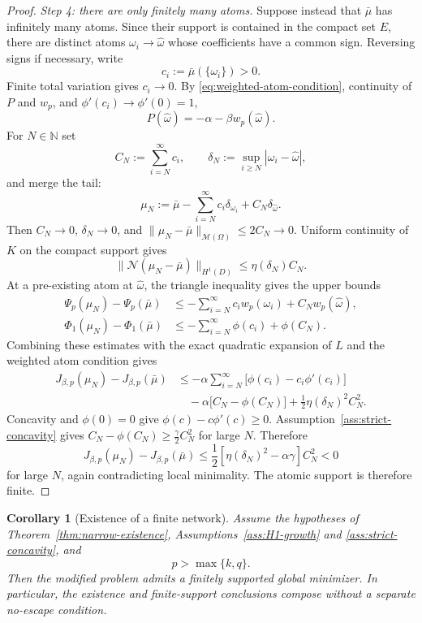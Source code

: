 \documentclass[11pt]{amsart}
\newtheorem{corollary}[theorem]{Corollary}
\theoremstyle{definition}
\theoremstyle{remark}
\newcommand{\M}{\mathcal{M}}
\newcommand{\N}{\mathcal{N}}
\begin{document}
\begin{proof}
\medskip
\noindent
\emph{Step 4: there are only finitely many atoms.}
Suppose instead that $\bar\mu$ has infinitely many atoms.  Since their support
is contained in the compact set $E$, there are distinct atoms
$\omega_i\to\widehat\omega$ whose coefficients have a common sign.  Reversing
signs if necessary, write
\[
  c_i:=\bar\mu(\{\omega_i\})>0.
\]
Finite total variation gives $c_i\to0$.  By
\eqref{eq:weighted-atom-condition}, continuity of $P$ and $w_p$, and
$\phi'(c_i)\to\phi'(0)=1$,
\[
  P(\widehat\omega)
  =
  -\alpha-\beta w_p(\widehat\omega).
\]
For $N\in\mathbb{N}$ set
\[
  C_N:=\sum_{i=N}^\infty c_i,\qquad
  \delta_N:=\sup_{i\geq N}|\omega_i-\widehat\omega|,
\]
and merge the tail:
\[
  \mu_N
  :=
  \bar\mu-\sum_{i=N}^\infty c_i\delta_{\omega_i}
  +C_N\delta_{\widehat\omega}.
\]
Then $C_N\to0$, $\delta_N\to0$, and
$\|\mu_N-\bar\mu\|_{\M(\Omega)}\leq2C_N\to0$.  Uniform continuity of $K$ on
the compact support gives
\[
  \|\N(\mu_N-\bar\mu)\|_{H^1(D)}
  \leq\eta(\delta_N)C_N.
\]
At a pre-existing atom at $\widehat\omega$, the triangle inequality gives the
upper bounds
\begin{align*}
  \Psi_p(\mu_N)-\Psi_p(\bar\mu)
  &\leq
  -\sum_{i=N}^\infty c_i w_p(\omega_i)
  +C_N w_p(\widehat\omega),\\
  \Phi_1(\mu_N)-\Phi_1(\bar\mu)
  &\leq
  -\sum_{i=N}^\infty\phi(c_i)+\phi(C_N).
\end{align*}
Combining these estimates with the exact quadratic expansion of $L$ and the
weighted atom condition gives
\begin{align*}
  J_{\beta,p}(\mu_N)-J_{\beta,p}(\bar\mu)
  &\leq
  -\alpha\sum_{i=N}^\infty
  \bigl[\phi(c_i)-c_i\phi'(c_i)\bigr]\\
  &\quad
  -\alpha\bigl[C_N-\phi(C_N)\bigr]
  +\frac12\eta(\delta_N)^2C_N^2.
\end{align*}
Concavity and $\phi(0)=0$ give
$\phi(c)-c\phi'(c)\geq0$.  Assumption~\ref{ass:strict-concavity} gives
$C_N-\phi(C_N)\geq\frac{\gamma}{2}C_N^2$ for large $N$.  Therefore
\[
  J_{\beta,p}(\mu_N)-J_{\beta,p}(\bar\mu)
  \leq
  \frac12\left[\eta(\delta_N)^2-\alpha\gamma\right]C_N^2<0
\]
for large $N$, again contradicting local minimality.  The atomic support is
therefore finite.
\end{proof}

\begin{corollary}[Existence of a finite network]
\label{cor:finite-global-minimizer}
Assume the hypotheses of Theorem~\ref{thm:narrow-existence},
Assumptions~\ref{ass:H1-growth} and \ref{ass:strict-concavity}, and
\[
  p>\max\{k,q\}.
\]
Then the modified problem admits a finitely supported global minimizer.  In
particular, the existence and finite-support conclusions compose without a
separate no-escape condition.
\end{corollary}
\end{document}
